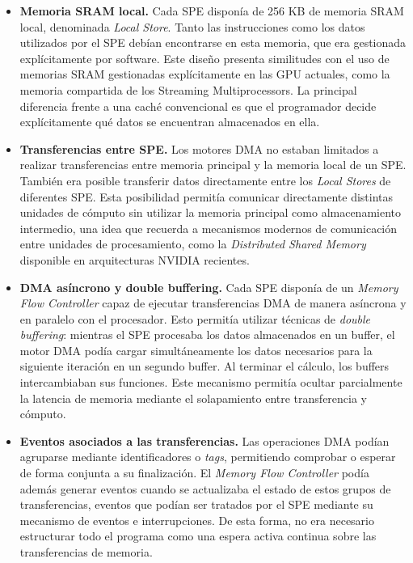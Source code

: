\begin{itemize}

\item \textbf{Memoria SRAM local.}
Cada SPE disponía de 256 KB de memoria SRAM local, denominada \textit{Local Store}. Tanto las instrucciones como los datos utilizados por el SPE debían encontrarse en esta memoria, que era gestionada explícitamente por software. Este diseño presenta similitudes con el uso de memorias SRAM gestionadas explícitamente en las GPU actuales, como la memoria compartida de los Streaming Multiprocessors. La principal diferencia frente a una caché convencional es que el programador decide explícitamente qué datos se encuentran almacenados en ella.

\item \textbf{Transferencias entre SPE.}
Los motores DMA no estaban limitados a realizar transferencias entre memoria principal y la memoria local de un SPE. También era posible transferir datos directamente entre los \textit{Local Stores} de diferentes SPE. Esta posibilidad permitía comunicar directamente distintas unidades de cómputo sin utilizar la memoria principal como almacenamiento intermedio, una idea que recuerda a mecanismos modernos de comunicación entre unidades de procesamiento, como la \textit{Distributed Shared Memory} disponible en arquitecturas NVIDIA recientes.

\item \textbf{DMA asíncrono y double buffering.}
Cada SPE disponía de un \textit{Memory Flow Controller} capaz de ejecutar transferencias DMA de manera asíncrona y en paralelo con el procesador. Esto permitía utilizar técnicas de \textit{double buffering}: mientras el SPE procesaba los datos almacenados en un buffer, el motor DMA podía cargar simultáneamente los datos necesarios para la siguiente iteración en un segundo buffer. Al terminar el cálculo, los buffers intercambiaban sus funciones. Este mecanismo permitía ocultar parcialmente la latencia de memoria mediante el solapamiento entre transferencia y cómputo.

\item \textbf{Eventos asociados a las transferencias.}
Las operaciones DMA podían agruparse mediante identificadores o \textit{tags}, permitiendo comprobar o esperar de forma conjunta a su finalización. El \textit{Memory Flow Controller} podía además generar eventos cuando se actualizaba el estado de estos grupos de transferencias, eventos que podían ser tratados por el SPE mediante su mecanismo de eventos e interrupciones. De esta forma, no era necesario estructurar todo el programa como una espera activa continua sobre las transferencias de memoria.

\end{itemize}

